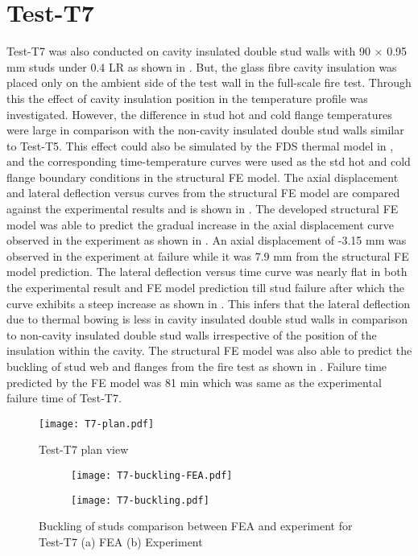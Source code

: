 \section*{Test-T7}

Test-T7 was also conducted on cavity insulated double stud walls with 90 $\times$ 0.95 mm studs under 0.4 LR as shown in . But, the glass fibre cavity insulation was placed only on the ambient side of the test wall in the full-scale fire test. Through this the effect of cavity insulation position in the temperature profile was investigated. However, the difference in stud hot and cold flange temperatures were large in comparison with the non-cavity insulated double stud walls similar to Test-T5. This effect could also be simulated by the FDS thermal model in ,  and the corresponding time-temperature curves were used as the std hot and cold flange boundary conditions in the structural FE model. The axial displacement and lateral deflection versus curves from the structural FE model are compared against the experimental results and is shown in . The developed structural FE model was able to predict the gradual increase in the axial displacement curve observed in the experiment as shown in . An axial displacement of -3.15 mm was observed in the experiment at failure while it was 7.9 mm from the structural FE model prediction. The lateral deflection versus time curve was nearly flat in both the experimental result and FE model prediction till stud failure after which the curve exhibits a steep increase as shown in . This infers that the lateral deflection due to thermal bowing is less in cavity insulated double stud walls in comparison to non-cavity insulated double stud walls irrespective of the position of the insulation within the cavity. The structural FE model was also able to predict the buckling of stud web and flanges from the fire test as shown in . Failure time predicted by the FE model was 81 min which was same as the experimental failure time of Test-T7.
\begin{figure}[!htbp]
	\centering
			\texttt{[image: T7-plan.pdf]}\\
		\caption{Test-T7 plan view}
		\label{fig:T7-plan-FEA}
\end{figure}
\begin{figure}[!htbp]
	\centering
	\begin{subfigure}[b]{0.85\textwidth}
		\centering
		\texttt{[image: T7-buckling-FEA.pdf]}
		\caption{}
		\label{subfig:T7-buckling-FEA}
	\end{subfigure}
	\begin{subfigure}[b]{0.35\textwidth}
		\centering
		\texttt{[image: T7-buckling.pdf]}
		\caption{}
		\label{subfig:T7-buckling-FEA-Exp}
	\end{subfigure}
	   \caption{Buckling of studs comparison between FEA and experiment for Test-T7 (a) FEA (b) Experiment}
	   \label{fig:T7-buckling-FE-vs-Exp}
\end{figure} 
